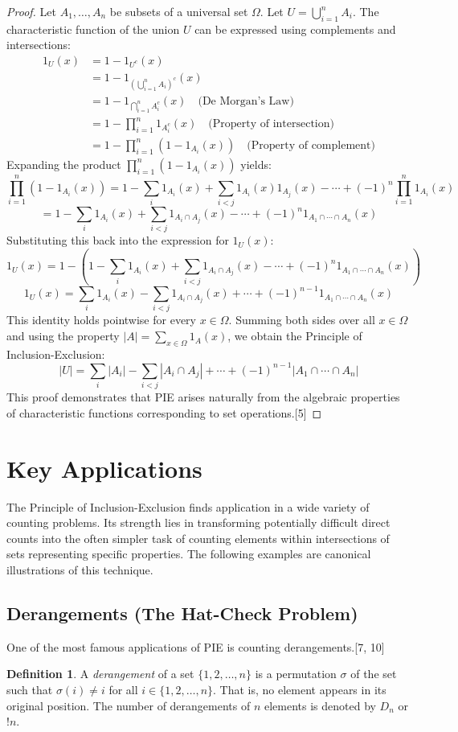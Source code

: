 \documentclass[11pt]{amsart}
\theoremstyle{plain}
\theoremstyle{definition}
\newtheorem{definition}[theorem]{Definition}
\theoremstyle{remark}
\begin{document}
\begin{proof}
Let $A_1, \ldots, A_n$ be subsets of a universal set $\Omega$. Let $U = \bigcup_{i=1}^n A_i$. The characteristic function of the union $U$ can be expressed using complements and intersections:
\begin{align*}
1_U(x) &= 1 - 1_{U^c}(x) \\
&= 1 - 1_{\left(\bigcup_{i=1}^n A_i\right)^c}(x) \\
&= 1 - 1_{\bigcap_{i=1}^n A_i^c}(x) \quad \text{(De Morgan's Law)} \\
&= 1 - \prod_{i=1}^n 1_{A_i^c}(x) \quad \text{(Property of intersection)} \\
&= 1 - \prod_{i=1}^n (1 - 1_{A_i}(x)) \quad \text{(Property of complement)}
\end{align*}
Expanding the product $\prod_{i=1}^n (1 - 1_{A_i}(x))$ yields:
\[ \prod_{i=1}^n (1 - 1_{A_i}(x)) = 1 - \sum_i 1_{A_i}(x) + \sum_{i<j} 1_{A_i}(x)1_{A_j}(x) - \cdots + (-1)^n \prod_{i=1}^n 1_{A_i}(x) \]
\[ = 1 - \sum_i 1_{A_i}(x) + \sum_{i<j} 1_{A_i \cap A_j}(x) - \cdots + (-1)^n 1_{A_1 \cap \cdots \cap A_n}(x) \]
Substituting this back into the expression for $1_U(x)$:
\[ 1_U(x) = 1 - \left( 1 - \sum_i 1_{A_i}(x) + \sum_{i<j} 1_{A_i \cap A_j}(x) - \cdots + (-1)^n 1_{A_1 \cap \cdots \cap A_n}(x) \right) \]
\[ 1_U(x) = \sum_i 1_{A_i}(x) - \sum_{i<j} 1_{A_i \cap A_j}(x) + \cdots + (-1)^{n-1} 1_{A_1 \cap \cdots \cap A_n}(x) \]
This identity holds pointwise for every $x \in \Omega$. Summing both sides over all $x \in \Omega$ and using the property $|A| = \sum_{x \in \Omega} 1_A(x)$, we obtain the Principle of Inclusion-Exclusion:
\[ |U| = \sum_i |A_i| - \sum_{i<j} |A_i \cap A_j| + \cdots + (-1)^{n-1} |A_1 \cap \cdots \cap A_n| \]
This proof demonstrates that PIE arises naturally from the algebraic properties of characteristic functions corresponding to set operations.[5]
\end{proof}

\section{Key Applications}
The Principle of Inclusion-Exclusion finds application in a wide variety of counting problems. Its strength lies in transforming potentially difficult direct counts into the often simpler task of counting elements within intersections of sets representing specific properties. The following examples are canonical illustrations of this technique.

\subsection{Derangements (The Hat-Check Problem)}
One of the most famous applications of PIE is counting derangements.[7, 10]
\begin{definition}
A \emph{derangement} of a set $\{1, 2, \ldots, n\}$ is a permutation $\sigma$ of the set such that $\sigma(i) \neq i$ for all $i \in \{1, 2, \ldots, n\}$. That is, no element appears in its original position. The number of derangements of $n$ elements is denoted by $D_n$ or $!n$.
\end{definition}
\end{document}
